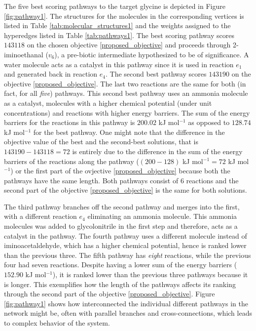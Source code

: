 The five best scoring pathways to the target glycine is depicted in Figure \ref{fig:pathway1}.
The structures for the molecules in the corresponding vertices is listed in Table \ref{tab:molecular_structures1} and the weights assigned to the hyperedges listed in Table \ref{tab:pathways1}.
The \textcolor{myBlue}{best scoring pathway} scores $143118$ on the chosen objective \eqref{proposed_objective} and proceeds through 2-iminoethanal ($v_6$), a pre-biotic intermediate hypothesized to be of significance. 
A water molecule acts as a catalyst in this pathway since it is used in reaction $e_1$ and generated back in reaction $e_4$. 
The \textcolor{myGreen}{second best pathway} scores $143190$ on the objective \eqref{proposed_objective}. The last two reactions are the same for both (in fact, for all \emph{five}) pathways. 
This second best pathway uses an ammonia molecule as a catalyst, molecules with a higher chemical potential (under unit concentrations) and reactions with higher energy barriers. The sum of the energy barriers for the reactions in this pathway is $200.02$ kJ mol$^{-1}$ as opposed to $128.74$ kJ mol$^{-1}$ for the best pathway. 
One might note that the difference in the objective value of the best and the second-best solutions, that is $143190-143118 = 72$ is entirely due to the difference in the sum of the energy barriers of the reactions along the pathway ($(200 - 128)$ kJ mol$^{-1} = 72$ kJ mol$^{-1}$) or the first part of the ovjective \eqref{proposed_objective} because both the pathways have the same length. Both pathways consist of $6$ reactions and the second part of the objective \eqref{proposed_objective} is the same for both solutions.

The \textcolor{myBrown}{third pathway} branches off the second pathway and merges into the first, with a different reaction $e_4$ eliminating an ammonia molecule. This ammonia molecules was added to glycolonitrile in the first step and therefore, acts as a catalyst in the pathway.
The \textcolor{myCyan}{fourth pathway} uses a different molecule instead of iminoacetaldehyde, which has a higher chemical potential, hence is ranked lower than the previous three. 
The \textcolor{myBlue2}{fifth pathway} has \emph{eight} reactions, while the previous four had seven reactions. Despite having a lower sum of the energy barriers ($152.90$ kJ mol$^{-1}$), it is ranked lower than the previous three pathways because it is longer.
This exemplifies how the length of the pathways affects its ranking through the second part of the objective \eqref{proposed_objective}.
Figure \ref{fig:pathway1} shows how interconnected the individual different pathways in the network might be, often with parallel branches and cross-connections, which leads to complex behavior of the system. 

